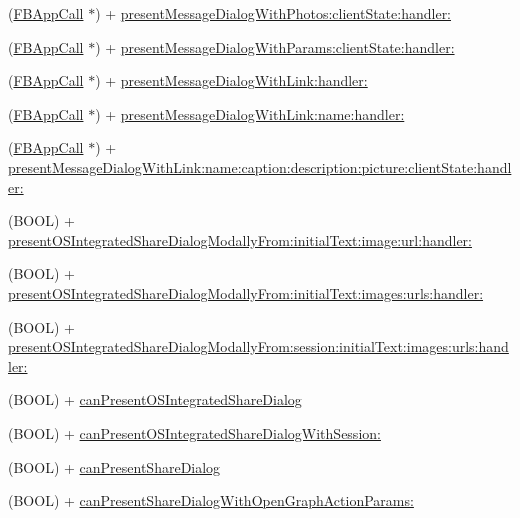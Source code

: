\begin{DoxyCompactItemize}
(\hyperlink{interfaceFBAppCall}{F\+B\+App\+Call} $\ast$) + \hyperlink{interfaceFBDialogs_aa349cd5cb466439073782e084c422ca0}{present\+Message\+Dialog\+With\+Photos\+:client\+State\+:handler\+:}
\item 
(\hyperlink{interfaceFBAppCall}{F\+B\+App\+Call} $\ast$) + \hyperlink{interfaceFBDialogs_a09310f22ebc3ece7c91ee5bb47ccc4c6}{present\+Message\+Dialog\+With\+Params\+:client\+State\+:handler\+:}
\item 
(\hyperlink{interfaceFBAppCall}{F\+B\+App\+Call} $\ast$) + \hyperlink{interfaceFBDialogs_a33517c3089b65e7ce4c64c1c22c4e4af}{present\+Message\+Dialog\+With\+Link\+:handler\+:}
\item 
(\hyperlink{interfaceFBAppCall}{F\+B\+App\+Call} $\ast$) + \hyperlink{interfaceFBDialogs_ab32ff5073473c59f8ced776e087d5fe4}{present\+Message\+Dialog\+With\+Link\+:name\+:handler\+:}
\item 
(\hyperlink{interfaceFBAppCall}{F\+B\+App\+Call} $\ast$) + \hyperlink{interfaceFBDialogs_a6441b5e4b196ed9b32180aa14400c05a}{present\+Message\+Dialog\+With\+Link\+:name\+:caption\+:description\+:picture\+:client\+State\+:handler\+:}
\item 
(B\+O\+OL) + \hyperlink{interfaceFBDialogs_a872dc61b3ce463fea47eec224f8fb635}{present\+O\+S\+Integrated\+Share\+Dialog\+Modally\+From\+:initial\+Text\+:image\+:url\+:handler\+:}
\item 
(B\+O\+OL) + \hyperlink{interfaceFBDialogs_ac4ebf0c4beb5669aadce04ae3b8d8b2b}{present\+O\+S\+Integrated\+Share\+Dialog\+Modally\+From\+:initial\+Text\+:images\+:urls\+:handler\+:}
\item 
(B\+O\+OL) + \hyperlink{interfaceFBDialogs_a923876e895060843c9ee0ce0836f1a7a}{present\+O\+S\+Integrated\+Share\+Dialog\+Modally\+From\+:session\+:initial\+Text\+:images\+:urls\+:handler\+:}
\item 
(B\+O\+OL) + \hyperlink{interfaceFBDialogs_a4239a93d5d1b150b93cf589bca6f46e1}{can\+Present\+O\+S\+Integrated\+Share\+Dialog}
\item 
(B\+O\+OL) + \hyperlink{interfaceFBDialogs_a268b4ee8ee491e006770a51cefa36eeb}{can\+Present\+O\+S\+Integrated\+Share\+Dialog\+With\+Session\+:}
\item 
(B\+O\+OL) + \hyperlink{interfaceFBDialogs_a017ecb9200d66140929cce227723a4d5}{can\+Present\+Share\+Dialog}
\item 
(B\+O\+OL) + \hyperlink{interfaceFBDialogs_ad8921a3906d28210cad0c0871e99f4bd}{can\+Present\+Share\+Dialog\+With\+Open\+Graph\+Action\+Params\+:}
\item 

\end{DoxyCompactItemize}
